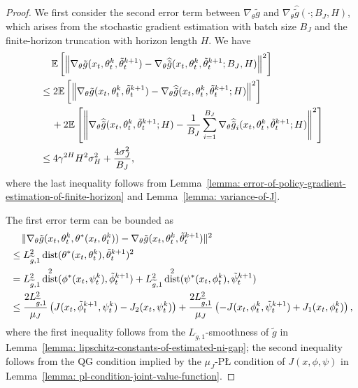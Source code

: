 \documentclass{article}
\theoremstyle{plain}
\theoremstyle{definition}
\theoremstyle{remark}
\DeclareMathOperator{\dist}{dist}
\def\E{\mathbb E}
\begin{document}
\begin{proof}
   

We first consider the second error term between $\nabla_\theta \tilde{g}$ and $\nabla_\theta \widehat{\tilde{g}}(\cdot;B_J,H)$, which arises from the stochastic gradient estimation with batch size $B_J$ and the finite-horizon truncation with horizon length $H$. We have
    \begin{align}
        & \quad \, \E \left[ \left\|\nabla_\theta \tilde{g}(x_t,\theta_t^k, \tilde{\theta}_t^{k+1})  - \nabla_\theta\widehat{\tilde{g}}(x_t,\theta_t^k, \tilde{\theta}_t^{k+1};B_J,H)  \right\|^2\right] \notag \\
        & \leq  2 \E \left[ \left\|\nabla_\theta \tilde{g}(x_t,\theta_t^k, \tilde{\theta}_t^{k+1})  - \nabla_\theta \widehat{\tilde{g}}(x_t,\theta_t^k, \tilde{\theta}_t^{k+1};H)  \right\|^2\right]  \notag \\
        & \quad \, +2 \E  \left[ \left\|\nabla_\theta \widehat{\tilde{g}}(x_t,\theta_t^k, \tilde{\theta}_t^{k+1}; H)  - \frac{1}{B_J} \sum_{i=1}^{B_J}\nabla_\theta \widehat{\tilde{g}}_i(x_t,\theta_t^k, \tilde{\theta}_t^{k+1};H)  \right\|^2\right]\\
        & \leq 4 \gamma^{2H} H^2 \sigma_H^2 + \frac{4\sigma_J^2}{B_J},\label{eq: error-bound-of-g-large-batch}
    \end{align}
    where the last inequality follows from Lemma~\ref{lemma: error-of-policy-gradient-estimation-of-finite-horizon} and Lemma~\ref{lemma: variance-of-J}. 

    The first error term can be bounded as
    \begin{align}
        &  \quad \, \|\nabla_\theta \tilde{g}(x_t,\theta_t^k,\theta^*(x_t,\theta_t^k)) -  \nabla_\theta \tilde{g}(x_t,\theta_t^k, \tilde{\theta}_t^{k+1})  \|^2 \notag  \\
        & \leq L^2_{\widetilde{g},1} \dist(\theta^*(x_t,\theta_t^k), \tilde{\theta}_t^{k+1})^2 \\
        & = L^2_{\widetilde{g},1} \dist^2 (\phi^*(x_t,\psi_t^k), \tilde{\phi}_t^{k+1}) +L^2_{\widetilde{g},1} \dist^2 (\psi^*(x_t,\phi_t^k), \tilde{\psi}_t^{k+1}) \notag\\
        & \leq \frac{2L^2_{\widetilde{g},1}}{\mu_J} \left( J(x_t,\tilde{\phi}_t^{k+1},\psi_t^k) - J_2(x_t,\psi_t^k) \right) + \frac{2L^2_{\widetilde{g},1}}{\mu_J} \left( - J(x_t,\phi_t^k,\tilde{\psi}_t^{k+1}) + J_1(x_t,\phi_t^k) \right) , \label{eq: bound-of-bias-term-1-large-batch}
    \end{align}
    where the first inequality follows from the $L_{\widetilde g,1}$-smoothness of $\tilde{g}$ in Lemma~\ref{lemma: lipschitz-constants-of-estimated-ni-gap}; the second inequality follows from the QG condition implied by the $\mu_J$-P{\L} condition of $J(x,\phi,\psi)$ in Lemma~\ref{lemma: pl-condition-joint-value-function}.


\end{proof}
\end{document}
